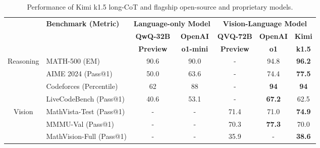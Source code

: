 \documentclass{article}
\begin{document}
\begin{table}[h]
    \centering
    \begin{tabular}{@{}c l | c c | c c c@{}}
    \toprule
    & \multirow{3}{*}{\centering \textbf{Benchmark {\tiny (Metric)}}} 
    & \multicolumn{2}{c|}{\textbf{Language-only Model}} 
    & \multicolumn{3}{c}{\textbf{Vision-Language Model}} \\ 
    & & \textbf{QwQ-32B} & \textbf{OpenAI} & \textbf{QVQ-72B} & \textbf{OpenAI} & \textbf{Kimi} \\
    & & \textbf{Preview} & \textbf{o1-mini} & \textbf{Preview} & \textbf{o1} & \textbf{k1.5}  \\
    \midrule

    \multirow{4}{*}{Reasoning}
    & MATH-500 {\tiny (EM)} & 90.6 & 90.0 & - & 94.8 & \textbf{96.2} \\
    & AIME 2024 {\tiny (Pass@1)} & 50.0 & 63.6 & - & 74.4 & \textbf{77.5} \\
    & Codeforces {\tiny (Percentile)} & 62 & 88 & - & \textbf{94} & \textbf{94} \\
    & LiveCodeBench  {\tiny (Pass@1)} & 40.6 & 53.1 & - & \textbf{67.2} & 62.5 \\
    \midrule

    \multirow{3}{*}{Vision} 
    & MathVista-Test {\tiny (Pass@1)} & - & - & 71.4 & 71.0 & \textbf{74.9} \\
    & MMMU-Val {\tiny (Pass@1)} & - & - & 70.3 & \textbf{77.3} & 70.0 \\
    & MathVision-Full {\tiny (Pass@1)} & - & - & 35.9 & - & \textbf{38.6} \\

    \bottomrule
    \end{tabular}
    \vspace{1em}
    \caption{Performance of Kimi k1.5 long-CoT and  flagship open-source and proprietary models.}
    \label{tab:long_perf}
\end{table}
\end{document}
